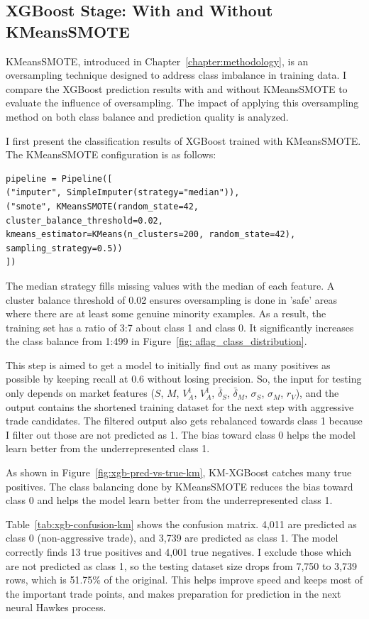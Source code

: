 \subsection{XGBoost Stage: With and Without KMeansSMOTE}

KMeansSMOTE, introduced in Chapter~\ref{chapter:methodology}, is an oversampling technique designed to address class imbalance in training data. I compare the XGBoost prediction results with and without KMeansSMOTE to evaluate the influence of oversampling. The impact of applying this oversampling method on both class balance and prediction quality is analyzed.

I first present the classification results of XGBoost trained with KMeansSMOTE. The KMeansSMOTE configuration is as follows:

\begin{verbatim}
pipeline = Pipeline([
("imputer", SimpleImputer(strategy="median")),
("smote", KMeansSMOTE(random_state=42,
cluster_balance_threshold=0.02,
kmeans_estimator=KMeans(n_clusters=200, random_state=42),
sampling_strategy=0.5))
])
\end{verbatim}

The median strategy fills missing values with the median of each feature. A cluster balance threshold of 0.02 ensures oversampling is done in 'safe' areas where there are at least some genuine minority examples. As a result, the training set has a ratio of 3:7 about class 1 and class 0. It significantly increases the class balance from 1:499 in Figure~\ref{fig: aflag_class_distribution}.

This step is aimed to get a model to initially find out as many positives as possible by keeping recall at 0.6 without losing precision. So, the input for testing only depends on market features ($S$, $M$, $V_A^{1}$, $V_A^{1}$, $\bar{\delta}_S$, $\bar{\delta}_M$, $\sigma_S$, $\sigma_M$, $r_V$), and the output contains the shortened training dataset for the next step with aggressive trade candidates. The filtered output also gets rebalanced towards class 1 because I filter out those are not predicted as 1. The bias toward class 0 helps the model learn better from the underrepresented class 1.

As shown in Figure~\ref{fig:xgb-pred-vs-true-km}, KM-XGBoost catches many true positives. The class balancing done by KMeansSMOTE reduces the bias toward class 0 and helps the model learn better from the underrepresented class 1.

Table~\ref{tab:xgb-confusion-km} shows the confusion matrix. 4,011 are predicted as class 0 (non-aggressive trade), and 3,739 are predicted as class 1. The model correctly finds 13 true positives and 4,001 true negatives. I exclude those which are not predicted as class 1, so the testing dataset size drops from 7,750 to 3,739 rows, which is 51.75\% of the original. This helps improve speed and keeps most of the important trade points, and makes preparation for prediction in the next neural Hawkes process.

